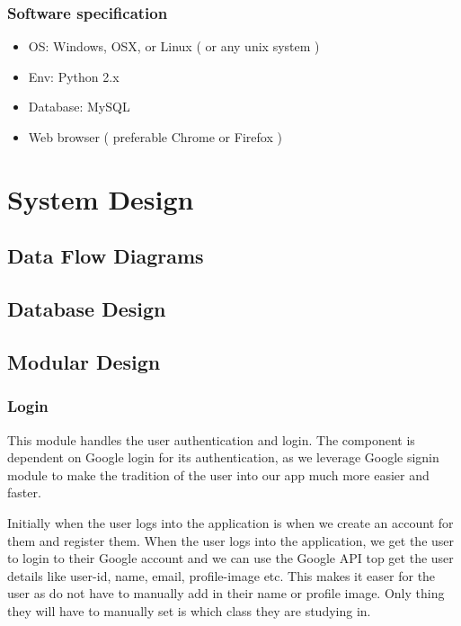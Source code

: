 \documentclass{article}
\begin{document}
\subsubsection{Software specification}
\begin{itemize}
\item OS: Windows, OSX, or Linux ( or any unix system )
\item Env: Python 2.x
\item Database: MySQL
\item Web browser ( preferable Chrome or Firefox )
\end{itemize}
\vspace{1em}

\vspace{1em}

\newpage

\section{System Design}
\vspace{1em}

\subsection{Data Flow Diagrams}
\vspace{1em}
\subsection{Database Design}
\vspace{1em}
\subsection{Modular Design}

\subsubsection{Login}
This module handles the user authentication and login.
The component is dependent on Google login for its authentication, as we leverage Google signin module to make the tradition of the user into our app much more easier and faster.

Initially when the user logs into the application is when we create an account for them and register them. When the user logs into the application, we get the user to login to their Google account and we can use the Google API top get the user details like user-id, name, email, profile-image etc. This makes it easer for the user as do not have to manually add in their name or profile image. Only thing they will have to manually set is which class they are studying in.
\end{document}

